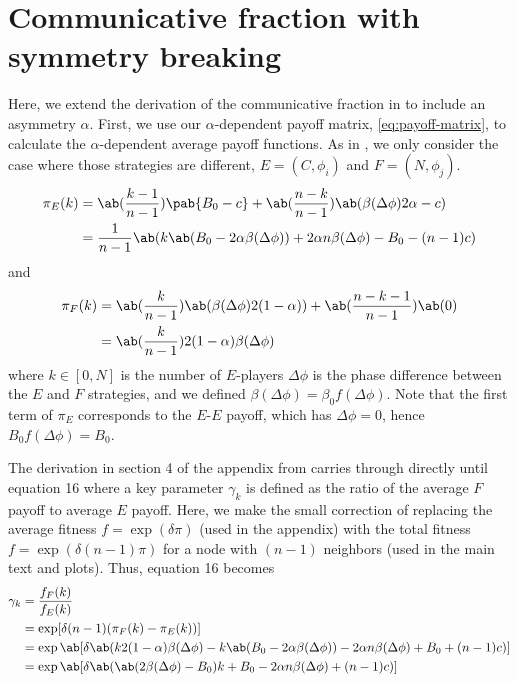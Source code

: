 \section{Communicative fraction with symmetry breaking}
Here, we extend the derivation of the communicative fraction
in \tripp{} to include an asymmetry $\alpha$.
First, we use our $\alpha$-dependent payoff matrix, \cref{eq:payoff-matrix},
to calculate the $\alpha$-dependent average payoff functions.
As in \tripp{}, we only consider the case where those strategies are different,
$E = (C, \phi_i)$ and $F = (N, \phi_j)$.
\begin{align}
  \pi_E(k) &= \ab(\frac{k-1}{n-1}) \pab{B_0 - c}
                + \ab(\frac{n-k}{n-1}) \ab(\beta(\Delta\phi) 2\alpha - c) \\
           &= \frac{1}{n-1}
               \ab(k \ab(B_0 - 2 \alpha \beta(\Delta\phi))
                 + 2 \alpha n \beta(\Delta\phi) - B_0 - (n-1) c)
\end{align}
and
\begin{align}
  \pi_F(k) &= \ab(\frac{k}{n-1}) \ab(\beta(\Delta\phi) 2 (1-\alpha))
                + \ab(\frac{n-k-1}{n-1}) \ab(0) \\
           &= \ab(\frac{k}{n-1}) 2 (1-\alpha) \beta(\Delta\phi)
\end{align}
where $k \in [0,N]$ is the number of $E$-players
$\Delta \phi$ is the phase difference between the $E$ and $F$
strategies,
and we defined $\beta(\Delta \phi) = \beta_0 f(\Delta \phi)$.
Note that the first term of $\pi_E$ corresponds
to the $E$-$E$ payoff, which has $\Delta \phi = 0$,
hence $B_0 f(\Delta \phi) = B_0$.

The derivation in section 4 of the appendix
from \tripp{}
carries through directly until equation 16
where a key parameter $\gamma_k$ is defined
as the ratio of the average $F$ payoff to average $E$ payoff.
Here, we make the small correction of replacing
the average fitness $f = \exp(\delta \pi)$ (used in the appendix)
with the total fitness $f = \exp(\delta (n-1) \pi)$
for a node with $(n-1)$ neighbors
(used in the main text and plots).
Thus, equation 16 becomes
\begin{align*}
  \gamma_k &= \frac{f_F(k)}{f_E(k)} \\
           &= \exp[\delta (n-1) (\pi_F(k) - \pi_E(k))]
           \\
           &= \exp\ab[\delta \ab(
    k 2 (1-\alpha) \beta(\Delta\phi)
    - k \ab(B_0 - 2 \alpha \beta(\Delta\phi))
                 - 2 \alpha n \beta(\Delta\phi) + B_0 + (n-1) c)] \\
      &= \exp\ab[\delta \ab(
    \ab(2 \beta(\Delta\phi) - B_0) k
                 + B_0 - 2 \alpha n \beta(\Delta\phi) + (n-1) c)]
\end{align*}

